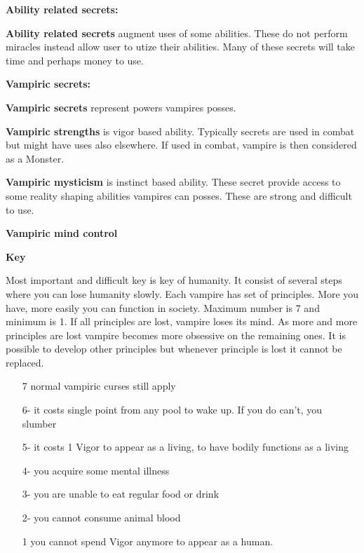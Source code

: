 \documentclass[a4paper, 12pt, finnish]{report}
\begin{document}
\cols{
\CultureSecret{}
}

\textbf{Ability related secrets:}

\textbf{Ability related secrets} augment uses of some abilities. 
These do not perform miracles instead allow user to utize their abilities.
Many of these secrets will take time and perhaps money to use.

\cols{
\AbilitySecret{}
}



\textbf{Vampiric secrets:}

\textbf{Vampiric secrets} represent powers vampires posses.

\textbf{Vampiric strengths } is vigor based ability. 
Typically secrets are used in combat but might have uses also elsewhere.
If used in combat, vampire is then considered as a Monster.


\cols{
\VampiricStrengthSecret{}
}

\textbf{Vampiric mysticism } is instinct based ability.
These secret provide access to some reality shaping abilities vampires can posses.
These are strong and difficult to use.


\cols{
\VampiricMysticismSecret{}
}

\textbf{Vampiric mind control }

\cols{
\VampiricMindControlSecret{}
}

\pagebreak


\textbf{Key}

Most important and difficult key is key of humanity. It consist of several steps where you can lose humanity slowly. 
Each vampire has set of principles.
More you have, more easily you can function in society.
Maximum number is 7 and minimum is 1.
If all principles are lost, vampire loses its mind.
As more and more principles are lost vampire becomes more obsessive on the remaining ones.
It is possible to develop other principles but whenever principle is lost it cannot be replaced.

\begin{itemize}
\setlength\itemsep{-2pt}
\item[7] normal vampiric curses still apply
\item[6-] it costs single point from any pool to wake up. If you do can't, you slumber
\item[5-] it costs 1 Vigor to appear as a living, to have bodily functions as a living
\item[4-] you acquire some mental illness
\item[3-] you are unable to eat regular food or drink
\item[2-] you cannot consume animal blood
\item[1] you cannot spend Vigor anymore to appear as a human.
\end{itemize}
\end{document}
